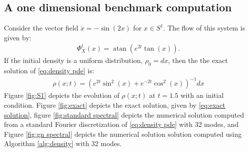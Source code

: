 \documentclass[final,leqno]{siamltex1213}
\begin{document}
\subsection{A one dimensional benchmark computation}
\label{sec:benchmark}
Consider the vector field $\dot{x} = -\sin(2 x)$ for $x \in S^{1}$.
The flow of this system is given by:
\begin{align}
	\Phi_{X}^{t}(x) = \operatorname{atan} \left( e^{2t} \tan( x) \right).
\end{align}
If the initial density is a uniform distribution, $\rho_{0} = dx$, then the the exact solution of \eqref{eq:density pde} is:
\begin{align}
	\rho(x;t) =  \left( e^{2t} \sin^{2}(x) + e^{-2t} \cos^{2}(x) \right)^{-1}  dx \label{eq:exact solution}
\end{align}
Figure \ref{fig:S1} depicts the evolution of $\rho(x;t)$ at $t=1.5$ with an initial condition.
Figure \ref{fig:exact} depicts the exact solution, given by \eqref{eq:exact solution},  figure \ref{fig:standard spectral} depicts the numerical solution computed from a standard Fourier discretization of \eqref{eq:density pde} with 32 modes, and Figure \ref{fig:gn spectral} depicts the numerical solution solution computed using Algorithm \ref{alg:density} with 32 modes.
\end{document}
